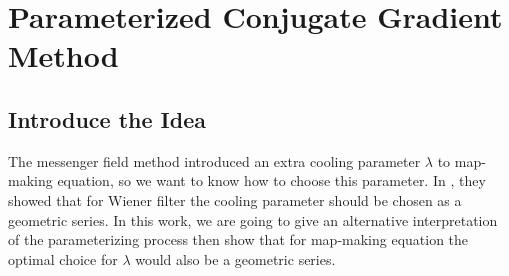 \documentclass[twocolumn,linenumbers]{aastex631}
\newcommand{\vbd}{\vb{d}}
\newcommand{\vbm}{\vb{m}}
\newcommand{\vbb}{\vb{b}}
\newcommand{\inv}[1]{#1^{-1}}
\newcommand{\hatm}{\vb{\hat{m}}}
\newcommand{\Pdagger}{P^{\dagger}}
\newcommand{\PPinv}[1]{\inv{\qty(\Pdagger #1 P)}}
\begin{document}
%
%

\section{Parameterized Conjugate Gradient Method}

\subsection{Introduce the Idea}
The messenger field method introduced an extra cooling parameter $\lambda$ to
map-making equation, so we want to know how to choose this parameter.
In \cite{2017MNRAS.468.1782K}, they showed that for Wiener filter the cooling
parameter should be chosen as a geometric series.
In this work, we are going to give an alternative interpretation of the
parameterizing process then show that for map-making equation the optimal choice
for $\lambda$ would also be a geometric series.
\end{document}
